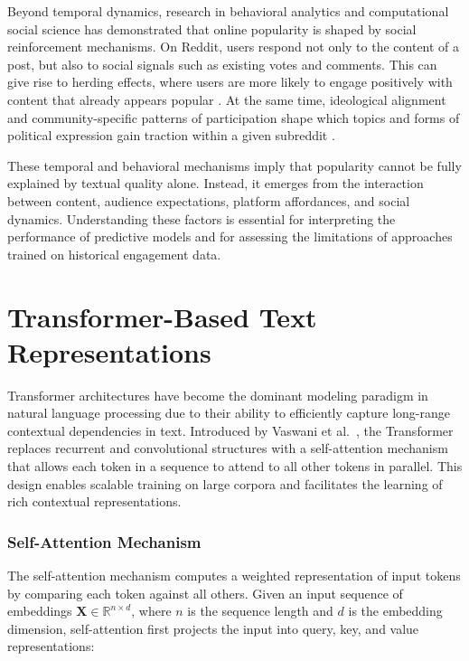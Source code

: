 Beyond temporal dynamics, research in behavioral analytics and computational social science has demonstrated that online popularity is shaped by social reinforcement mechanisms. On Reddit, users respond not only to the content of a post, but also to social signals such as existing votes and comments. This can give rise to herding effects, where users are more likely to engage positively with content that already appears popular \cite{stoddard2015popularity,waller2021quantifying}. At the same time, ideological alignment and community-specific patterns of participation shape which topics and forms of political expression gain traction within a given subreddit \cite{waller2021quantifying}.

These temporal and behavioral mechanisms imply that popularity cannot be fully explained by textual quality alone. Instead, it emerges from the interaction between content, audience expectations, platform affordances, and social dynamics. Understanding these factors is essential for interpreting the performance of predictive models and for assessing the limitations of approaches trained on historical engagement data.

\section{Transformer-Based Text Representations}

Transformer architectures have become the dominant modeling paradigm in natural language processing due to their ability to efficiently capture long-range contextual dependencies in text. Introduced by Vaswani et al.~\cite{Vaswani2017}, the Transformer replaces recurrent and convolutional structures with a self-attention mechanism that allows each token in a sequence to attend to all other tokens in parallel. This design enables scalable training on large corpora and facilitates the learning of rich contextual representations.

\subsubsection{Self-Attention Mechanism}

The self-attention mechanism computes a weighted representation of input tokens by comparing each token against all others. Given an input sequence of embeddings $\mathbf{X} \in \mathbb{R}^{n \times d}$, where $n$ is the sequence length and $d$ is the embedding dimension, self-attention first projects the input into query, key, and value representations:

